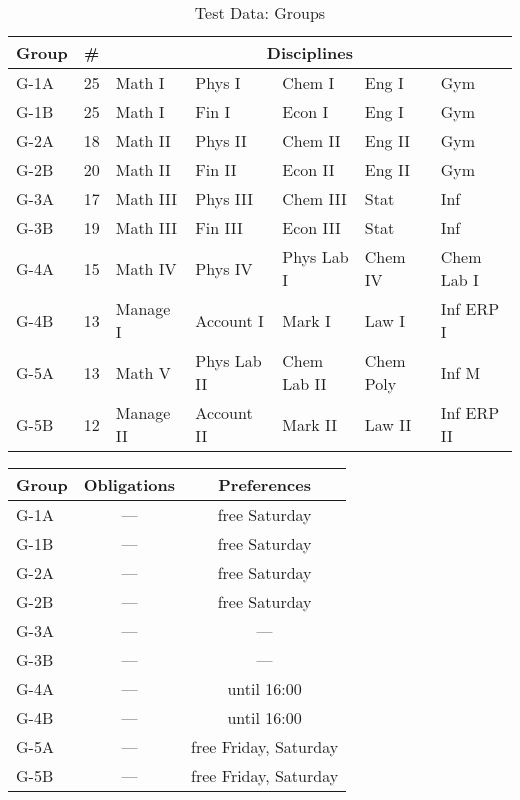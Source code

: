 \documentclass[../header]{subfiles}
\begin{document}
\begin{table}[H]\caption{Test Data: Groups}
\label{data:groups}
  \centering
  \begin{tabular}{lclllll}
    Group & \# & \multicolumn{5}{c}{Disciplines} \\\hline\hline
    G-1A  & 25 & Math I     & Phys I        & Chem I          & Eng I       & Gym         \\
    G-1B  & 25 & Math I     & Fin I         & Econ I          & Eng I       & Gym         \\\hline
    G-2A  & 18 & Math II    & Phys II       & Chem II         & Eng II      & Gym         \\
    G-2B  & 20 & Math II    & Fin II        & Econ II         & Eng II      & Gym         \\\hline
    G-3A  & 17 & Math III   & Phys III      & Chem III        & Stat        & Inf         \\
    G-3B  & 19 & Math III   & Fin III       & Econ III        & Stat        & Inf         \\\hline
    G-4A  & 15 & Math IV    & Phys IV       & Phys Lab I      & Chem IV     & Chem Lab I \\
    G-4B  & 13 & Manage I   & Account I     & Mark I          & Law I       & Inf ERP I   \\\hline
    G-5A  & 13 & Math V     & Phys Lab II   & Chem Lab II     & Chem Poly   & Inf M       \\
    G-5B  & 12 & Manage II  & Account II    & Mark II         & Law II      & Inf ERP II  \\\hline
  \end{tabular}
\end{table}

\begin{table}[H]\ContinuedFloat
  \centering
  \begin{tabular}{lcc}
    Group & Obligations & Preferences \\\hline\hline
    G-1A  & ---         & free Saturday \\
    G-1B  & ---         & free Saturday \\\hline
    G-2A  & ---         & free Saturday \\
    G-2B  & ---         & free Saturday \\\hline
    G-3A  & ---         & ---         \\
    G-3B  & ---         & ---         \\\hline
    G-4A  & ---         & until 16:00 \\
    G-4B  & ---         & until 16:00 \\\hline
    G-5A  & ---         & free Friday, Saturday \\
    G-5B  & ---         & free Friday, Saturday \\\hline
  \end{tabular}
\end{table}
\end{document}
